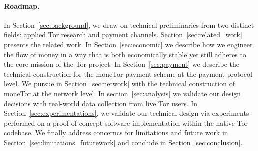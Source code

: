 \paragraph*{Roadmap.} In Section~\ref{sec:background}, we draw on technical preliminaries from two distinct fields: applied Tor research and payment channels. Section~\ref{sec:related_work} presents the related work. In Section~\ref{sec:economic} we describe how we engineer the flow of money in a way that is both economically stable yet still adheres to the core mission of the Tor project. In Section~\ref{sec:payment} we 
describe the technical construction for the moneTor payment scheme at the payment protocol level. We pursue in Section~\ref{sec:network} with the technical construction of moneTor at the network level. In section~\ref{sec:analysis} we  validate our design decisions with real-world data collection from live Tor users. 
In Section~\ref{sec:experimentations}, we validate our technical design via experiments performed on a proof-of-concept software implementation within the native Tor codebase. We finally address concerncs for limitations and future work in Section~\ref{sec:limitations_futurework} and conclude in Section~\ref{sec:conclusion}.